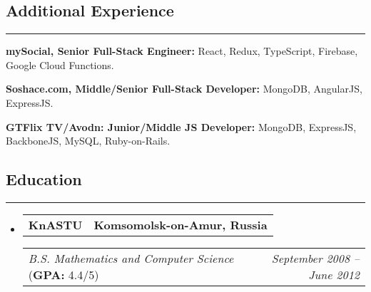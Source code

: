 \documentclass[11pt,letterpaper]{article}
\makeatletter
\newcommand{\headerrow}[2]
{\begin{tabular*}{\linewidth}{l@{\extracolsep{\fill}}r}
#1 &
#2 \\
\end{tabular*}}
\makeatother
\begin{document}
\renewcommand\labelitemi{$\bullet$}


\subsection*{\Large Additional Experience}
\vspace{-.5em}
\hrule
\vspace{1em}
\begin{itemize*}
	\item \textbf{mySocial, Senior Full-Stack Engineer:} React, Redux, TypeScript, Firebase, Google Cloud Functions.
	\item \textbf{Soshace.com, Middle/Senior Full-Stack Developer:} MongoDB, AngularJS, ExpressJS.
	\item \textbf{GTFlix TV/Avodn: Junior/Middle JS Developer:} MongoDB, ExpressJS, BackboneJS, MySQL, Ruby-on-Rails.
\end{itemize*}

\subsection*{\Large Education}
\vspace{-.5em}
\hrule
\vspace{1em}

\begin{itemize}[leftmargin=1em]
	\parskip=0.1em
		
	\item
	      \headerrow
	      {\textbf{KnASTU}}
	      {\textbf{Komsomolsk-on-Amur, Russia}}
	      \headerrow
	      {\emph{B.S. Mathematics and Computer Science} (\textbf{GPA:} 4.4/5)}
	      {\emph{September 2008 -- June 2012}}
	      	      
\end{itemize}
\end{document}
